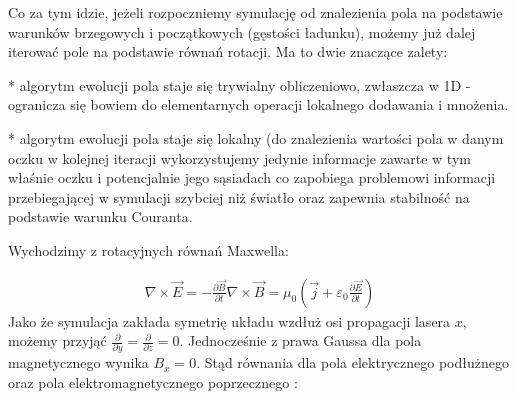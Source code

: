 Co za tym idzie, jeżeli rozpoczniemy symulację od znalezienia pola na
podstawie warunków brzegowych i początkowych (gęstości ładunku), możemy już
dalej iterować pole na podstawie równań rotacji. Ma to dwie znaczące
zalety:

* algorytm ewolucji pola staje się trywialny obliczeniowo,
zwłaszcza w 1D - ogranicza się bowiem do elementarnych operacji lokalnego
dodawania i mnożenia.

* algorytm ewolucji pola staje się lokalny (do
znalezienia wartości pola w danym oczku w kolejnej iteracji wykorzystujemy
jedynie informacje zawarte w tym właśnie oczku i potencjalnie jego
sąsiadach  co zapobiega
problemowi informacji przebiegającej w symulacji szybciej niż światło oraz
zapewnia stabilność na podstawie warunku Couranta.


%
%
%    


Wychodzimy z rotacyjnych równań Maxwella:

\begin{align}
    \nabla \times \vec{E} = -\frac{\partial \vec{B}}{\partial t}
    \nabla \times \vec{B} = \mu_0 (\vec{j} + \varepsilon_0 \frac{\partial \vec{E}}{\partial t})
    \label{eqn:Maxwell-rotation-derivation}
 \end{align}
Jako że symulacja zakłada symetrię układu wzdłuż osi propagacji lasera $x$,
możemy przyjąć $\frac{\partial}{\partial y} = \frac{\partial}{\partial z} =
0 $.  Jednocześnie z prawa Gaussa dla pola magnetycznego wynika $B_x = 0$.
Stąd równania dla pola elektrycznego podłużnego oraz pola
elektromagnetycznego poprzecznego :

